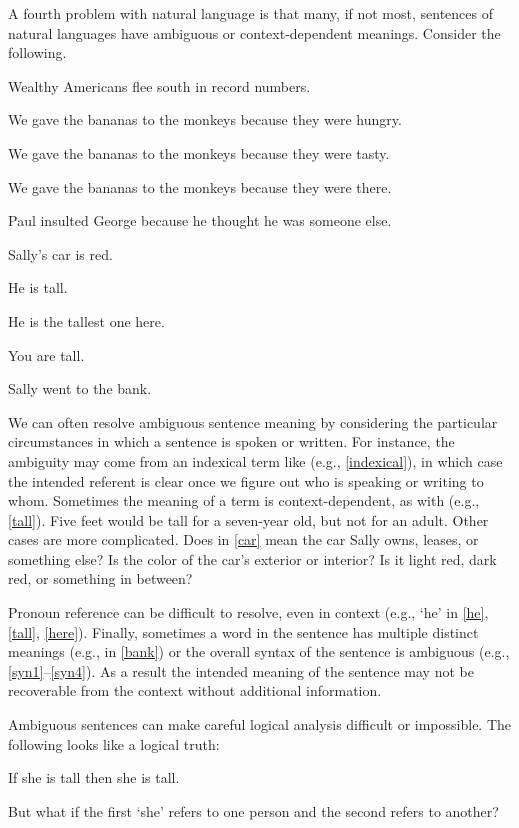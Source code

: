 A fourth problem with natural language is that many, if not most, sentences of natural languages have ambiguous or context-dependent meanings. 
Consider the following. 
\begin{menumerate}
\item\label{syn1} Wealthy Americans flee south in record numbers.
\item\label{syn2} We gave the bananas to the monkeys because they
were hungry.
\item\label{syn3} We gave the bananas to the monkeys because they
were tasty.
\item\label{syn4} We gave the bananas to the monkeys because they
were there.
\item\label{he} Paul insulted George because he thought he was
someone else. 
\item\label{car} Sally's car is red. 
\item\label{tall} He is tall. 
\item\label{here} He is the tallest one here. 
\item\label{indexical} You are tall. 
\item\label{bank} Sally went to the bank. 
\end{menumerate} 
We can often resolve ambiguous sentence meaning by considering the particular circumstances in which a sentence is spoken or written. 
For instance, the ambiguity may come from an indexical term like  (e.g., \ref{indexical}), in which case the intended referent is clear once we figure out who is speaking or writing to whom. 
Sometimes the meaning of a term is context-dependent, as with  (e.g., \ref{tall}). 
Five feet would be tall for a seven-year old, but not for an adult. 
Other cases are more complicated. 
Does  in \ref{car} mean the car Sally owns, leases, or something else? 
Is  the color of the car's exterior or interior? 
Is it light red, dark red, or something in between? 

Pronoun reference can be difficult to resolve, even in context (e.g., `he' in \ref{he}, \ref{tall}, \ref{here}). 
Finally, sometimes a word in the sentence has multiple distinct meanings (e.g.,  in \ref{bank}) or the overall syntax of the sentence is ambiguous (e.g., \ref{syn1}--\ref{syn4}). As a result the intended meaning of the sentence may not be recoverable from the context without additional information.

Ambiguous sentences can make careful logical analysis difficult or impossible. The following looks like a logical truth:
\begin{menumerate}
	\item If she is tall then she is tall.
\end{menumerate}
But what if the first `she' refers to one person and the second refers to another? 

